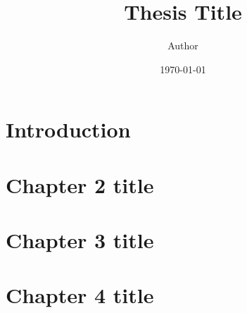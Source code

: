 

\author{Author}
\date{\today}
\title{Thesis Title}


\onehalfspacing
\frontmatter
\maketitle
\mainmatter
\tableofcontents

\chapter{Introduction}


\chapter{Chapter 2 title}


\chapter{Chapter 3 title}


\chapter{Chapter 4 title}



\printbibliography

